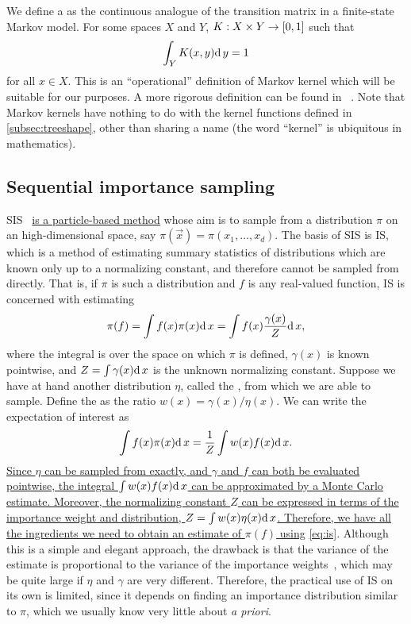 {We define a  as the continuous analogue of the transition
matrix in a finite-state Markov model.  For some spaces $X$ and $Y$, $K : X
\times Y \to [0, 1]$ such that
\begin{align}
    \label{eq:mk}
    \int_Y K(x, y) \mathrm{d}\, y = 1
\end{align}
for all $x \in X$. This is an ``operational'' definition of Markov kernel which
will be suitable for our purposes. A more rigorous definition can be found in
\eg~\autocite{kallenberg2006foundations}. Note that Markov kernels have nothing
to do with the kernel functions defined in \cref{subsec:treeshape}, other than
sharing a name (the word ``kernel'' is ubiquitous in mathematics).

\subsection{Sequential importance sampling}
\label{subsec:sis}

\Gls{SIS}~\autocite{gordon1993novel} {\color{blue}\uline{is a particle-based
method}} whose aim is to sample from a distribution $\pi$ on an
high-dimensional space, say $\pi(\vec{x}) = \pi(x_1, \ldots, x_d)$. The basis
of \gls{SIS} is \gls{IS}, which is a method of estimating summary statistics of
distributions which are known only up to a normalizing constant, and therefore
cannot be sampled from directly. That is, if $\pi$ is such a distribution and
$f$ is any real-valued function, \gls{IS} is concerned with estimating
\[
  \pi(f) = \int f(x)\pi(x)\mathrm{d}\, x = \int f(x) \frac{\gamma(x)}{Z} \mathrm{d}\, x,
\]
where the integral is over the space on which $\pi$ is defined, $\gamma(x)$ is
known pointwise, and $Z = \int \gamma(x) \mathrm{d}\, x$ is the unknown normalizing
constant. Suppose we have at hand another distribution $\eta$, called the
, from which we are able to sample. Define the
 as the ratio $w(x) = \gamma(x)/\eta(x)$. We can write
the expectation of interest as
{\color{blue}
\begin{align}
  \int f(x) \pi(x) \mathrm{d}\, x = \frac{1}{Z} \int w(x) f(x) \mathrm{d}\, x.
  \label{eq:is}
\end{align}
}
{\color{blue}\uline{
Since $\eta$ can be sampled from exactly, and $\gamma$ and $f$ can both be
evaluated pointwise, the integral $\int w(x) f(x) \mathrm{d}\, x$ can be approximated by
a Monte Carlo estimate. Moreover, the normalizing constant $Z$ can be expressed
in terms of the importance weight and distribution, $Z = \int w(x) \eta(x) \mathrm{d}\,
x$. Therefore, we have all the ingredients we need to obtain an estimate of
$\pi(f)$ using} \cref{eq:is}.} Although this is a simple and elegant approach,
the drawback is that the variance of the estimate is proportional to the
variance of the importance weights~\autocite{liu2008monte}, which may be quite
large if $\eta$ and $\gamma$ are very different. Therefore, the practical use
of \gls{IS} on its own is limited, since it depends on finding an importance
distribution similar to $\pi$, which we usually know very little about
\textit{a priori}.

}
